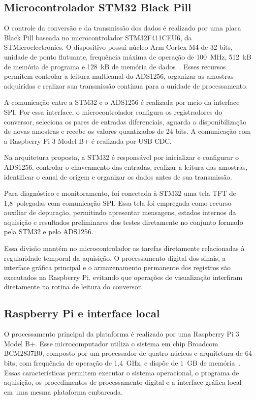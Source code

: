 \documentclass[a4paper,12pt]{fcte}
\begin{document}
\subsection{Microcontrolador STM32 Black Pill}
\label{subsec:stm32_blackpill}

O controle da conversão e da transmissão dos dados é realizado por uma placa Black Pill baseada no microcontrolador STM32F411CEU6, da STMicroelectronics. O dispositivo possui núcleo Arm Cortex-M4 de 32 bits, unidade de ponto flutuante, frequência máxima de operação de 100~MHz, 512~kB de memória de programa e 128~kB de memória de dados~\cite{st_stm32_modelo}. Esses recursos permitem controlar a leitura multicanal do ADS1256, organizar as amostras adquiridas e realizar sua transmissão contínua para a unidade de processamento.

A comunicação entre a STM32 e o ADS1256 é realizada por meio da interface SPI. Por essa interface, o microcontrolador configura os registradores do conversor, seleciona os pares de entradas diferenciais, aguarda a disponibilização de novas amostras e recebe os valores quantizados de 24 bits. A comunicação com a Raspberry Pi 3 Model B+ é realizada por USB CDC.

Na arquitetura proposta, a STM32 é responsável por inicializar e configurar o ADS1256, controlar o chaveamento das entradas, realizar a leitura das amostras, identificar o canal de origem e organizar os dados antes de sua transmissão.

Para diagnóstico e monitoramento, foi conectada à STM32 uma tela TFT de 1,8~polegadas com comunicação SPI. Essa tela foi empregada como recurso auxiliar de depuração, permitindo apresentar mensagens, estados internos da aquisição e resultados preliminares dos testes diretamente no conjunto formado pela STM32 e pelo ADS1256.

Essa divisão mantém no microcontrolador as tarefas diretamente relacionadas à regularidade temporal da aquisição. O processamento digital dos sinais, a interface gráfica principal e o armazenamento permanente dos registros são executados na Raspberry Pi, evitando que operações de visualização interfiram diretamente na rotina de leitura do conversor.

\subsection{Raspberry Pi e interface local}
\label{subsec:raspberry_interface}

O processamento principal da plataforma é realizado por uma Raspberry Pi 3 Model B+. Esse microcomputador utiliza o sistema em chip Broadcom BCM2837B0, composto por um processador de quatro núcleos e arquitetura de 64 bits, com frequência de operação de 1,4~GHz, e dispõe de 1~GB de memória~\cite{raspberrypi3_modelo}. Essas características permitem executar o sistema operacional, o programa de aquisição, os procedimentos de processamento digital e a interface gráfica local em uma mesma plataforma embarcada.
\end{document}
